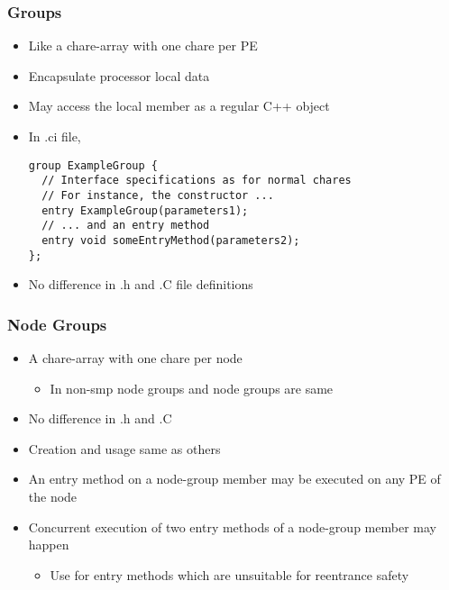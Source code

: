 \begin{frame}[fragile]
  \frametitle{Groups}
  \begin{itemize}
    \item Like a chare-array with one chare per PE
    \item Encapsulate processor local data
    \item May access the local member as a regular C++ object
    \item In .ci file, 
    \begin{lstlisting}
group ExampleGroup {
  // Interface specifications as for normal chares
  // For instance, the constructor ...
  entry ExampleGroup(parameters1);
  // ... and an entry method
  entry void someEntryMethod(parameters2);
};
    \end{lstlisting}
    \item No difference in .h and .C file definitions
  \end{itemize}
\end{frame}

\begin{frame}[fragile]
  \frametitle{Node Groups}
  \begin{itemize}
    \item A chare-array with one chare per node
    \begin{itemize}
      \item In non-smp node groups and node groups are same
    \end{itemize}
    \item No difference in .h and .C
    \item Creation and usage same as others
    \item An entry method on a node-group member may be executed on any PE of the node
    \item Concurrent execution of two entry methods of a node-group member may happen
    \begin{itemize}
      \item Use \code{[exclusive]} for entry methods which are unsuitable for reentrance safety
    \end{itemize}
  \end{itemize}
\end{frame}

